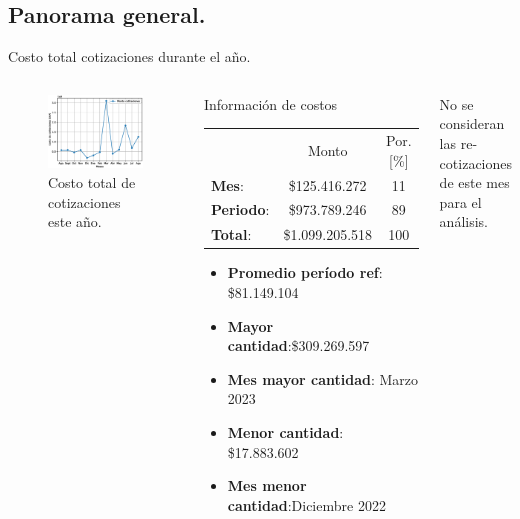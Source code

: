 \documentclass[aspectratio=169,xcolor=dvipsnames]{beamer}
\begin{document}
\subsection{Panorama general.}
\begin{frame}{Costo total cotizaciones durante el año.}


\begin{columns}[c]
    \begin{figure}
     \includegraphics[width=\textwidth]{EPS/costo_cotizaciones_mes.eps}
     \caption{Costo total de cotizaciones este año.}
     \label{graph:costo_cotizaciones_mes}
    \end{figure}

 \begin{block}{Información de costos}
 \begin{tabular}{lcc}
                & Monto & Por.[\%] \\
    \textbf{Mes}: &\$125.416.272&11\\
    \textbf{Periodo}:&\$973.789.246&89\\\hline
     \textbf{Total}: &\$1.099.205.518&100 \\ 
\end{tabular}
\scriptsize{
\begin{itemize}
    \item \textbf{Promedio período ref}: \$81.149.104
    \item \textbf{Mayor cantidad}:\$309.269.597
    \item \textbf{Mes mayor cantidad}: Marzo 2023
    \item \textbf{Menor cantidad}: \$17.883.602
    \item \textbf{Mes menor cantidad}:Diciembre 2022
\end{itemize}
}
\end{block}
\begin{block}{}
    \scriptsize{No se consideran las re-cotizaciones de este mes para el análisis.}
\end{block}
\end{columns}

\end{frame}
\end{document}
